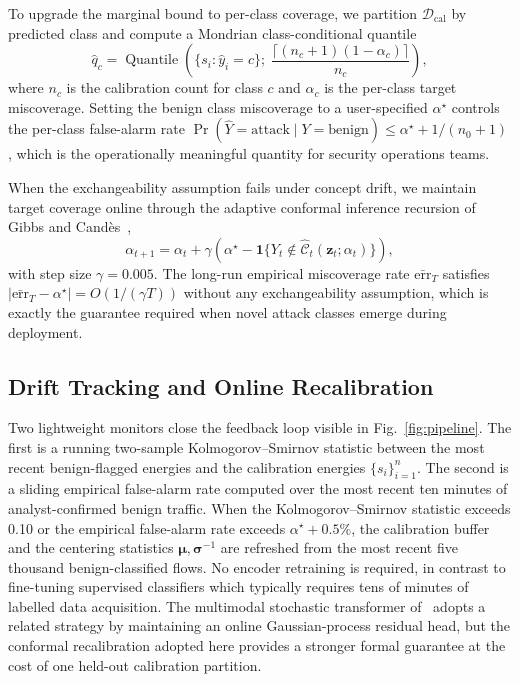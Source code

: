 \documentclass[journal,twoside]{IEEEtran}
\DeclareMathOperator{\Quantile}{Quantile}
\begin{document}
To upgrade the marginal bound to per-class coverage, we partition
$\mathcal{D}_\text{cal}$ by predicted class and compute a Mondrian
class-conditional quantile
\begin{equation}
\hat{q}_c = \Quantile\!\left(\{s_i : \hat{y}_i = c\};\; \frac{\lceil(n_c+1)(1-\alpha_c)\rceil}{n_c}\right),
\label{eq:mondrian}
\end{equation}
where $n_c$ is the calibration count for class $c$ and $\alpha_c$ is the
per-class target miscoverage. Setting the benign class miscoverage to a
user-specified $\alpha^\star$ controls the per-class false-alarm rate
$\Pr(\hat{Y}=\text{attack}\mid Y=\text{benign}) \le \alpha^\star + 1/(n_0+1)$,
which is the operationally meaningful quantity for security operations
teams.

When the exchangeability assumption fails under concept drift, we maintain
target coverage online through the adaptive conformal inference recursion
of Gibbs and Cand\`{e}s~\cite{gibbs2021aci},
\begin{equation}
\alpha_{t+1} = \alpha_t + \gamma\!\left(\alpha^\star - \mathbf{1}\!\{Y_t \notin \hat{\mathcal{C}}_t(\mathbf{z}_t;\alpha_t)\}\right),
\label{eq:aci}
\end{equation}
with step size $\gamma = 0.005$. The long-run empirical miscoverage rate
$\bar{\mathrm{err}}_T$ satisfies
$|\bar{\mathrm{err}}_T - \alpha^\star| = O(1/(\gamma T))$ without any
exchangeability assumption, which is exactly the guarantee required when
novel attack classes emerge during deployment.

\subsection{Drift Tracking and Online Recalibration}
\label{sec:method:drift}
Two lightweight monitors close the feedback loop visible in
Fig.~\ref{fig:pipeline}. The first is a running two-sample
Kolmogorov--Smirnov statistic between the most recent benign-flagged
energies and the calibration energies $\{s_i\}_{i=1}^n$. The second is a
sliding empirical false-alarm rate computed over the most recent ten
minutes of analyst-confirmed benign traffic. When the
Kolmogorov--Smirnov statistic exceeds 0.10 or the empirical false-alarm
rate exceeds $\alpha^\star + 0.5\%$, the calibration buffer and the
centering statistics $\bm{\mu}, \bm{\sigma}^{-1}$ are refreshed from the
most recent five thousand benign-classified flows. No encoder retraining
is required, in contrast to fine-tuning supervised classifiers which
typically requires tens of minutes of labelled data acquisition. The
multimodal stochastic transformer of~\cite{anaedevha2025stochmm} adopts a
related strategy by maintaining an online Gaussian-process residual head,
but the conformal recalibration adopted here provides a stronger formal
guarantee at the cost of one held-out calibration partition.
\end{document}
